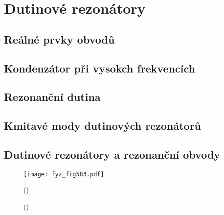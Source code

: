 \setchaptertoc
\chapter{Dutinové rezonátory}\label{fyz:IIchapXXIII}

\section{Reálné prvky obvodů}\label{fyz:IIchapXXIIIsecI}
\section{Kondenzátor při vysokch frekvencích}\label{fyz:IIchapXXIIIsecII}
\section{Rezonanční dutina}\label{fyz:IIchapXXIIIsecIII}
\section{Kmitavé mody dutinových rezonátorů}\label{fyz:IIchapXXIIIsecIV}
\section{Dutinové rezonátory a rezonanční obvody}\label{fyz:IIchapXXIIIsecV}

    \begin{figure}[ht!] %
      \centering
      \texttt{[image: fyz\_fig583.pdf]}
      \caption{
               (\cite[s.~707]{Feynman02})}
      \label{fyz:fig583}
    \end{figure}

    \begin{figure}[ht!]
      \centering
      \caption{
               (\cite[s.~748]{Feynman02})}
      \label{fyz:fig584}
    \end{figure}


